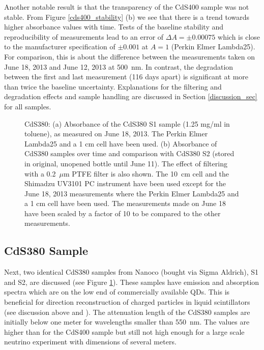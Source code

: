 \documentclass[cits]{JINST}
\begin{document}
Another notable result is that the transparency of the CdS400 sample was not stable. From Figure \ref{cds400_stability} (b) we see that there is a trend towards higher absorbance values with time. Tests of the baseline stability and reproducibility of measurements lead to an error of $\Delta A = \pm 0.00075$ which is close to the manufacturer specification of $\pm 0.001$ at $A=1$ (Perkin Elmer Lambda25). For comparison, this is about the difference between the measurements taken on June 18, 2013 and June 12, 2013 at 500~nm. In contrast, the degradation between the first and last measurement (116 days apart) is significant at more than twice the baseline uncertainty. Explanations for the filtering and degradation effects and sample handling are discussed in Section \ref{discussion_sec} for all samples.  

\begin{figure}
        \begin{center}
        \caption[]{CdS380: (a) Absorbance of the CdS380 S1 sample (1.25 mg/ml in toluene), as measured on June 18, 2013. The Perkin Elmer Lambda25 and a 1 cm cell have been used. (b) Absorbance of CdS380 samples over time and comparison with CdS380 S2 (stored in original, unopened bottle until June 11). The effect of filtering with a 0.2~$\mu$m PTFE filter is also shown. The 10~cm cell and the Shimadzu UV3101 PC instrument have been used except for the June 18, 2013 measurements where the Perkin Elmer Lambda25 and a 1 cm cell have been used. The measurements made on June 18 have been scaled by a factor of 10 to be compared to the other measurements. \label{cds380_stability}}
        \end{center}
\end{figure}

\subsection{CdS380 Sample}
Next, two identical CdS380 samples from Nanoco (bought via Sigma Aldrich), S1 and S2, are discussed (see Figure \ref{cds380_stability}). These samples have emission and absorption spectra which are on the low end of commercially available QDs. This is beneficial for direction reconstruction of charged particles in liquid scintillators (see discussion above and \cite{mitpaper,simpaper}). The attenuation length of the CdS380 samples are initially below one meter for wavelengths smaller than 550~nm. The values are higher than for the CdS400 sample but still not high enough for a large scale neutrino experiment with dimensions of several meters. 
\end{document}
